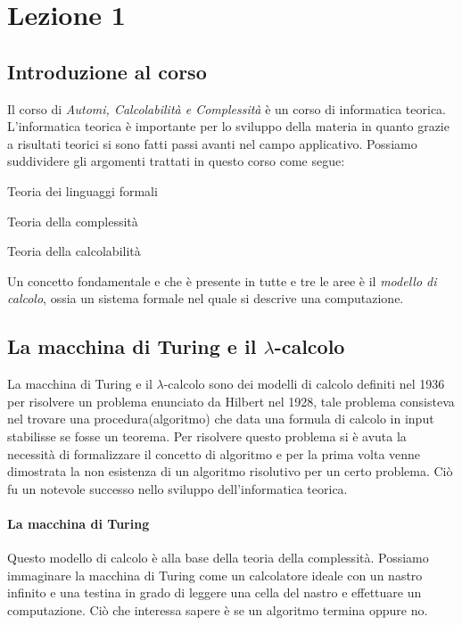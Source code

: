 
\section{Lezione 1}

\subsection{Introduzione al corso}
Il corso di \emph{Automi, Calcolabilità e Complessità} \`e un corso di informatica teorica. \newline
L'informatica teorica \`e importante per lo sviluppo della materia in quanto grazie a risultati teorici si sono fatti passi avanti nel campo applicativo.\newline
Possiamo suddividere gli argomenti trattati in questo corso come segue:
\begin{description}
	\item Teoria dei linguaggi formali
	\item Teoria della complessit\`a
	\item Teoria della calcolabilit\`a
\end{description}
Un concetto fondamentale e che \`e presente in tutte e tre le aree \`e il \emph{modello di calcolo}, ossia un sistema formale nel quale si descrive una computazione.

\subsection{La macchina di Turing e il  $\lambda$-calcolo}
La macchina di Turing e il $\lambda$-calcolo sono dei modelli di calcolo definiti nel 1936 per risolvere un problema enunciato da Hilbert nel 1928, tale problema consisteva nel trovare una procedura(algoritmo) che data una formula di calcolo in input stabilisse se fosse un teorema. Per risolvere questo problema si \`e avuta la necessit\`a di formalizzare il concetto di algoritmo e per la prima volta venne dimostrata la non esistenza di un algoritmo risolutivo per un certo problema. Ci\`o fu un notevole successo nello sviluppo dell'informatica teorica.

\paragraph{La macchina di Turing} Questo modello di calcolo \`e alla base della teoria della complessit\`a. Possiamo immaginare la macchina di Turing come un calcolatore ideale con un nastro infinito e una testina in grado di leggere una cella del nastro e effettuare un computazione. Ci\`o che interessa sapere \`e se un algoritmo termina oppure no.


